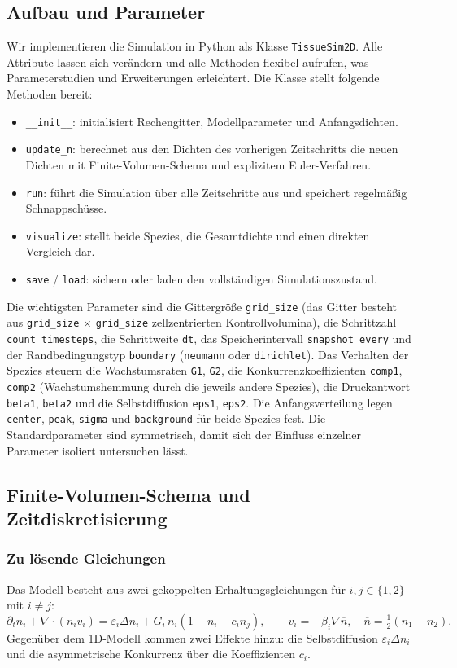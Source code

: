 \documentclass[11pt]{article}
\newcommand{\nbar}{\overline{n}}
\begin{document}
\subsection{Aufbau und Parameter}
Wir implementieren die Simulation in Python als Klasse \texttt{TissueSim2D}. Alle
Attribute lassen sich verändern und alle Methoden flexibel aufrufen, was
Parameterstudien und Erweiterungen erleichtert. Die Klasse stellt folgende
Methoden bereit:
\begin{itemize}
    \item \texttt{\_\_init\_\_}: initialisiert Rechengitter, Modellparameter und
    Anfangsdichten.
    \item \texttt{update\_n}: berechnet aus den Dichten des vorherigen
    Zeitschritts die neuen Dichten mit Finite-Volumen-Schema und explizitem
    Euler-Verfahren.
    \item \texttt{run}: führt die Simulation über alle Zeitschritte aus und
    speichert regelmäßig Schnappschüsse.
    \item \texttt{visualize}: stellt beide Spezies, die Gesamtdichte und einen
    direkten Vergleich dar.
    \item \texttt{save} / \texttt{load}: sichern oder laden den vollständigen
    Simulationszustand.
\end{itemize}

Die wichtigsten Parameter sind die Gittergröße \texttt{grid\_size} (das Gitter
besteht aus \texttt{grid\_size} $\times$ \texttt{grid\_size} zellzentrierten
Kontrollvolumina), die Schrittzahl \texttt{count\_timesteps}, die Schrittweite
\texttt{dt}, das Speicherintervall \texttt{snapshot\_every} und der
Randbedingungstyp \texttt{boundary} (\texttt{neumann} oder \texttt{dirichlet}).
Das Verhalten der Spezies steuern die Wachstumsraten \texttt{G1}, \texttt{G2}, die
Konkurrenzkoeffizienten \texttt{comp1}, \texttt{comp2} (Wachstumshemmung durch die
jeweils andere Spezies), die Druckantwort \texttt{beta1}, \texttt{beta2} und die
Selbstdiffusion \texttt{eps1}, \texttt{eps2}. Die Anfangsverteilung legen
\texttt{center}, \texttt{peak}, \texttt{sigma} und \texttt{background} für beide
Spezies fest. Die Standardparameter sind symmetrisch, damit sich der Einfluss
einzelner Parameter isoliert untersuchen lässt.

\subsection{Finite-Volumen-Schema und Zeitdiskretisierung}
\subsubsection{Zu lösende Gleichungen}
Das Modell besteht aus zwei gekoppelten Erhaltungsgleichungen für $i, j \in \{1,
2\}$ mit $i \neq j$:
\begin{equation}
    \partial_t n_i + \nabla \cdot (n_i v_i) = \varepsilon_i \Delta n_i
    + G_i\, n_i (1 - n_i - c_i n_j), \qquad
    v_i = -\beta_i \nabla \nbar, \quad \nbar = \tfrac{1}{2}(n_1 + n_2).
\end{equation}
Gegenüber dem 1D-Modell kommen zwei Effekte hinzu: die Selbstdiffusion
$\varepsilon_i \Delta n_i$ und die asymmetrische Konkurrenz über die
Koeffizienten $c_i$.
\end{document}
